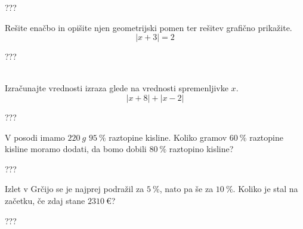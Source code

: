 \documentclass[addpoints]{exam}
\begin{document}
\begin{questions}
    
    
    \begin{solution}[10cm]
        ???
    \end{solution}




    \question[5]
    Rešite enačbo in opišite njen geometrijski pomen ter rešitev grafično prikažite.
    $$  \left\lvert x+3\right\rvert=2 $$
    
    
    \begin{solution}[8cm]
        ???
    \end{solution}


    \newpage


    ~\\



    \question[5]
    Izračunajte vrednosti izraza glede na vrednosti spremenljivke $x$.
    $$\left\lvert x+8 \right\rvert + \left\lvert x-2 \right\rvert $$
    
    
    \begin{solution}[10cm]
        ???
    \end{solution}



    \question[4]
    V posodi imamo $220~g$ $95~\%$ raztopine kisline. Koliko gramov $60~\%$ raztopine kisline moramo dodati, da bomo dobili $80~\%$ raztopino kisline?
    
    
    \begin{solution}[7cm]
        ???
    \end{solution}



    \newpage

    \question[4]
    Izlet v Grčijo se je najprej podražil za $5~\%$, nato pa še za $10~\%$. 
    Koliko je stal na začetku, če zdaj stane $2310~€$?
    
    
    \begin{solution}[3cm]
        ???
    \end{solution}

     \newpage



    

\end{questions}
\end{document}

